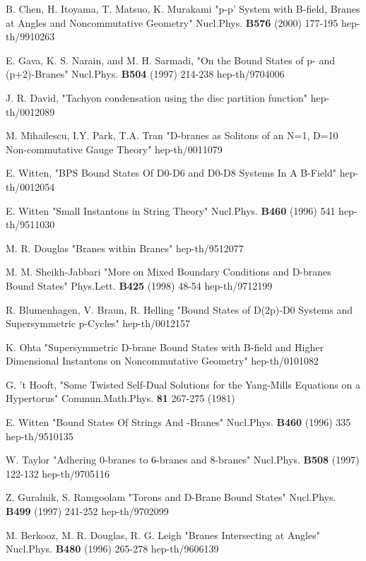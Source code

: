 \documentclass[a4paper,12pt]{article}
\begin{document}
\newpage

\begin{thebibliography}{99}

B. Chen, H. Itoyama, T. Matsuo, K. Murakami "p-p' System with B-field, Branes at Angles and Noncommutative Geometry"  Nucl.Phys. \textbf{B576} (2000) 177-195 hep-th/9910263

E. Gava, K. S. Narain, and M. H. Sarmadi, "On the Bound States of p- and (p+2)-Branes" Nucl.Phys. \textbf{B504} (1997) 214-238 hep-th/9704006   

J. R. David, "Tachyon condensation using the disc partition function" hep-th/0012089

M. Mihailescu, I.Y. Park, T.A. Tran "D-branes as Solitons of an N=1, D=10 Non-commutative Gauge Theory" hep-th/0011079

E. Witten, "BPS Bound States Of D0-D6 and D0-D8 Systems In A B-Field" hep-th/0012054

E. Witten "Small Instantons in String Theory" Nucl.Phys. \textbf{B460} (1996) 541 hep-th/9511030

M. R. Douglas "Branes within Branes" hep-th/9512077

M. M. Sheikh-Jabbari "More on Mixed Boundary Conditions and D-branes Bound States" Phys.Lett. \textbf{B425} (1998) 48-54 hep-th/9712199

R. Blumenhagen, V. Braun, R. Helling "Bound States of D(2p)-D0 Systems and
Supersymmetric p-Cycles" hep-th/0012157

K. Ohta "Supersymmetric D-brane Bound States with B-field and Higher Dimensional Instantons on Noncommutative Geometry" hep-th/0101082

G. 't Hooft, "Some Twisted Self-Dual Solutions for the Yang-Mills Equations on a Hypertorus" Commun.Math.Phys. \textbf{81} 267-275 (1981)

E. Witten "Bound States Of Strings And \coordHE{}-Branes" Nucl.Phys. \textbf{B460} (1996) 335 hep-th/9510135

W. Taylor "Adhering 0-branes to 6-branes and 8-branes" Nucl.Phys. \textbf{B508} (1997) 122-132 hep-th/9705116

Z. Guralnik, S. Ramgoolam "Torons and D-Brane Bound States" Nucl.Phys. \textbf{B499} (1997) 241-252 hep-th/9702099

M. Berkooz, M. R. Douglas, R. G. Leigh "Branes Intersecting at Angles" Nucl.Phys. \textbf{B480} (1996) 265-278 hep-th/9606139


\end{thebibliography}
\end{document}
